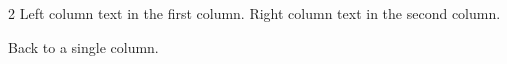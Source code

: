 \documentclass{article}
\begin{document}
\begin{paracol}{2}
Left column text in the first column.
\switchcolumn
Right column text in the second column.
\end{paracol}
Back to a single column.
\end{document}
